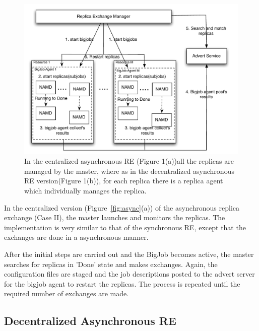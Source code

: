 \documentclass[a4paper,10pt]{article}
\begin{document}
\begin{figure}
\centering
\includegraphics[width=1\textwidth]{figures/centralized.pdf}
\caption{\small In the centralized asynchronous RE (Figure 1(a))all the replicas are managed by the master, where as in the decentralized asynchronous RE version(Figure 1(b)), for each replica there is a replica agent which individually manages the replica.}
\label{fig:cent}
\end{figure}

In the centralized version (Figure~\ref{fig:async}(a)) of the asynchronous replica exchange (Case II), the master launches and monitors the replicas. The implementation is very similar to that of the synchronous RE, except that the exchanges are done in a asynchronous manner. 

After the initial steps are carried out and the BigJob becomes active, the master searches for replicas in 'Done' state and makes exchanges. Again, the configuration files are staged and the job descriptions posted to the advert server for the bigjob agent to restart the replicas.%
The process is repeated until the required number of exchanges are made.

\subsection{Decentralized Asynchronous RE}
\end{document}
